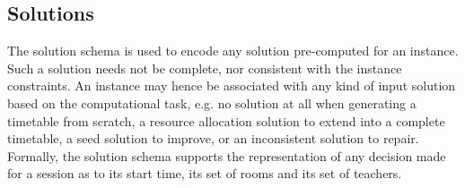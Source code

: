 \subsection{Solutions}
\label{sec:solution}

The solution schema is used to encode
any solution pre-computed for an instance.
Such a solution needs not be complete, nor consistent with the instance constraints.
An instance may hence be associated with any kind of input solution based on the
computational task,
e.g. no solution at all when generating a timetable from scratch, 
a resource allocation solution to extend into a complete timetable,
a seed solution to improve, 
or an inconsistent solution to repair.
Formally, the solution schema
supports the representation of
any decision made for a session
as to its start time,
its set of rooms
and its set of teachers.



